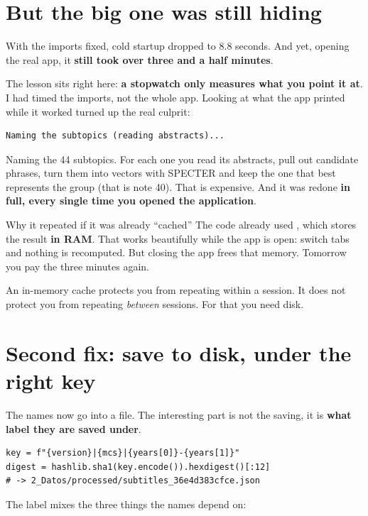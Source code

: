 \documentclass[11pt,a4paper]{article}
\begin{document}
\section{But the big one was still hiding}

With the imports fixed, cold startup dropped to 8.8 seconds. And yet, opening the real
app, it \textbf{still took over three and a half minutes}.

The lesson sits right here: \textbf{a stopwatch only measures what you point it at}. I
had timed the imports, not the whole app. Looking at what the app printed while it worked
turned up the real culprit:

\begin{verbatim}
Naming the subtopics (reading abstracts)...
\end{verbatim}

Naming the 44 subtopics. For each one you read its abstracts, pull out candidate phrases,
turn them into vectors with SPECTER and keep the one that best represents the group (that
is note 40). That is expensive. And it was redone \textbf{in full, every single time you
opened the application}.

\begin{concepto}{Why it repeated if it was already ``cached''}
The code already used , which stores the result \textbf{in RAM}.
That works beautifully while the app is open: switch tabs and nothing is recomputed. But
closing the app frees that memory. Tomorrow you pay the three minutes again.

An in-memory cache protects you from repeating within a session. It does not protect you
from repeating \emph{between} sessions. For that you need disk.
\end{concepto}

\section{Second fix: save to disk, under the right key}

The names now go into a  file. The interesting part is not the saving, it
is \textbf{what label they are saved under}.

\begin{verbatim}
key = f"{version}|{mcs}|{years[0]}-{years[1]}"
digest = hashlib.sha1(key.encode()).hexdigest()[:12]
# -> 2_Datos/processed/subtitles_36e4d383cfce.json
\end{verbatim}

The label mixes the three things the names depend on:
\end{document}
